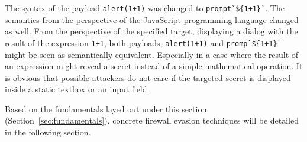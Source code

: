The syntax of the payload \verb|alert(1+1)| was changed to \verb|prompt`${1+1}`|. The semantics from the perspective of the JavaScript programming language changed as well. From the perspective of the specified target, displaying a dialog with the result of the expression \verb|1+1|, both payloads, \verb|alert(1+1)| and \verb|promp`${1+1}`| might be seen as semantically equivalent. Especially in a case where the result of an expression might reveal a secret instead of a simple mathematical operation. It is obvious that possible attackers do not care if the targeted secret is displayed inside a static textbox or an input field. \cite{js/taggedtemplates,js/alert,js/prompt}

Based on the fundamentals layed out under this section (Section~\ref{sec:fundamentals}), concrete firewall evasion techniques will be detailed in the following section.

